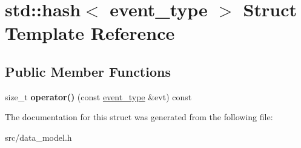 \hypertarget{structstd_1_1hash_3_01event__type_01_4}{}\section{std\+:\+:hash$<$ event\+\_\+type $>$ Struct Template Reference}
\label{structstd_1_1hash_3_01event__type_01_4}
\subsection*{Public Member Functions}
\begin{DoxyCompactItemize}
\item 
\mbox{\label{structstd_1_1hash_3_01event__type_01_4_ad45f8465347bc54724583f2abb7c7e8f}} 
size\+\_\+t {\bfseries operator()} (const \hyperlink{structevent__type}{event\+\_\+type} \&evt) const
\end{DoxyCompactItemize}


The documentation for this struct was generated from the following file\+:\begin{DoxyCompactItemize}
\item 
src/data\+\_\+model.\+h\end{DoxyCompactItemize}
